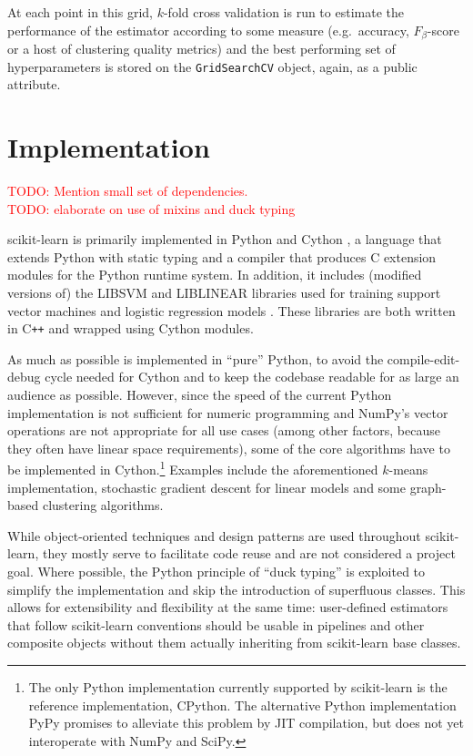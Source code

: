 \documentclass{llncs}
\begin{document}
At each point in this grid, $k$-fold cross validation is run
to estimate the performance of the estimator according to some measure
(e.g.\ accuracy, $F_\beta$-score or a host of clustering quality metrics)
and the best performing set of hyperparameters is stored
on the \texttt{GridSearchCV} object, again, as a public attribute.

\section{Implementation}

\label{sec:implementation}

\noindent \textcolor{red}{TODO: Mention small set of dependencies.}\\
\textcolor{red}{TODO: elaborate on use of mixins and duck typing}

scikit-learn is primarily implemented in Python and Cython
\citep{behnel2011cython},
a language that extends Python with static typing
and a compiler that produces C extension modules
for the Python runtime system.
In addition, it includes (modified versions of)
the \textsf{LIBSVM} and \textsf{LIBLINEAR} libraries
used for training support vector machines
and logistic regression models \citep{chang2011libsvm, fan2008}.
These libraries are both written in C{}\verb!++!
and wrapped using Cython modules.

As much as possible is implemented in ``pure'' Python,
to avoid the compile-edit-debug cycle needed for Cython
and to keep the codebase readable for as large an audience as possible.
However, since the speed of the current Python implementation
is not sufficient for numeric programming
and NumPy's vector operations are not appropriate for all use cases
(among other factors, because they often have linear space requirements),
some of the core algorithms have to be implemented in Cython.\footnote{
  The only Python implementation currently supported by scikit-learn
  is the reference implementation, CPython.
  The alternative Python implementation PyPy \citep{bolz2009tracing}
  promises to alleviate this problem by JIT compilation,
  but does not yet interoperate with NumPy and SciPy.
}
Examples include the aforementioned $k$-means implementation,
stochastic gradient descent for linear models
and some graph-based clustering algorithms.

While object-oriented techniques and design patterns
are used throughout scikit-learn,
they mostly serve to facilitate code reuse and are not considered a project goal.
Where possible, the Python principle of ``duck typing'' is exploited
to simplify the implementation and skip the introduction of superfluous classes.
This allows for extensibility and flexibility at the same time:
user-defined estimators that follow scikit-learn conventions
should be usable in pipelines and other composite objects
without them actually inheriting from scikit-learn base classes.
\end{document}
